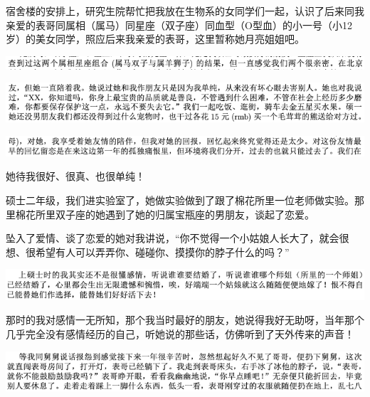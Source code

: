 \documentclass[9pt, b5paper]{article}
\begin{document}
宿舍楼的安排上，研究生院帮忙把我放在生物系的女同学们一起，认识了后来同我亲爱的表哥同属相（属马）同星座（双子座）同血型（O型血）的小一号（小12岁）的美女同学，照应后来我亲爱的表哥，这里暂称她月亮姐姐吧。

\begin{center}
\includegraphics[width=.9\linewidth]{./pic/backups_plans_20210503_114131.png}
\end{center}

\begin{center}
\includegraphics[width=.9\linewidth]{./pic/backups_plans_20210503_114150.png}
\end{center}

\begin{center}
\includegraphics[width=.9\linewidth]{./pic/backups_plans_20210503_114217.png}
\end{center}

她待我很好、很真、也很单纯！

硕士二年级，我们进实验室了，她做实验做到了跟了棉花所里一位老师做实验。那里棉花所里双子座的她遇到了她的归属宝瓶座的男朋友，谈起了恋爱。

坠入了爱情、谈了恋爱的她对我讲说，“你不觉得一个小姑娘人长大了，就会很想、很希望有人可以弄弄你、碰碰你、摸摸你的脖子什么的吗？”

\begin{center}
\includegraphics[width=.9\linewidth]{./pic/backups_plans_20210422_182503.png}
\end{center}

那时的我对感情一无所知，那个我当时最好的朋友，她说得我好无助呀，当年那个几乎完全没有感情经历的自己，听她说的那些话，仿佛听到了天外传来的声音！

\begin{center}
\includegraphics[width=.9\linewidth]{./pic/backups_plans_20210422_090034.png}
\end{center}
\end{document}
